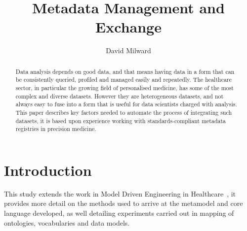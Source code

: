 \documentclass[runningheads]{llncs}
\begin{document}
	
\title{Metadata Management and Exchange }
		
\author{David Milward}
		\maketitle              %
	

	
	\begin{abstract}
		
		Data analysis depends on good data, and that means having data in a form that can be consistently queried, profiled and managed easily and repeatedly. The healthcare sector, in particular the growing field of personalised medicine, has some of the most complex and diverse datasets. However they are heterogeneous datasets, and not always easy to fuse into a form that is useful for data scientists charged with analysis. This paper describes key factors needed to automate the process of integrating such datasets, it is based upon experience working with standards-compliant metadata registries in precision medicine.
		
		
		
	

		
	\end{abstract}
	
	\section{Introduction}
	
	This study extends the work in Model Driven Engineering in Healthcare~\cite{modelsward19}, it provides more detail on the methods used to arrive at the metamodel and core language developed, as well detailing experiments carried out in mapping of ontologies, vocabularies and data models.
	
\end{document}

